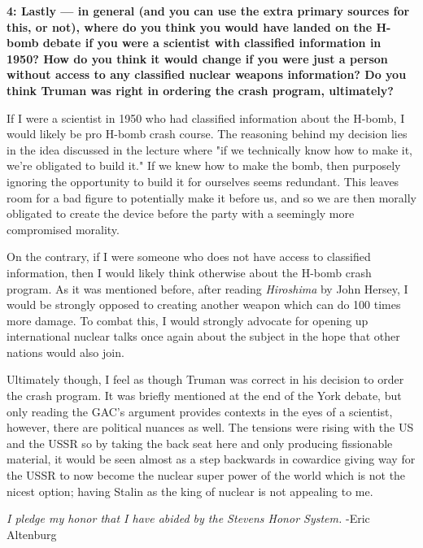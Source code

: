 \documentclass[12pt]{turabian-researchpaper}
\newcommand\question[2]{\noindent\textbf{#1: #2}}
\begin{document}
	\question{4}{Lastly — in general (and you can use the extra primary sources for this, or not), where do you think you would have landed on the H-bomb debate if you were a scientist with classified information in 1950? How do you think it would change if you were just a person without access to any classified nuclear weapons information? Do you think Truman was right in ordering the crash program, ultimately?}

	If I were a scientist in 1950 who had classified information about the H-bomb, I would likely be pro H-bomb crash course. The reasoning behind my decision lies in the idea discussed in the lecture where "if we technically know how to make it, we're obligated to build it." If we knew how to make the bomb, then purposely ignoring the opportunity to build it for ourselves seems redundant. This leaves room for a bad figure to potentially make it before us, and so we are then morally obligated to create the device before the party with a seemingly more compromised morality. 

	On the contrary, if I were someone who does not have access to classified information, then I would likely think otherwise about the H-bomb crash program. As it was mentioned before, after reading \textit{Hiroshima} by John Hersey, I would be strongly opposed to creating another weapon which can do 100 times more damage. To combat this, I would strongly advocate for opening up international nuclear talks once again about the subject in the hope that other nations would also join.

	Ultimately though, I feel as though Truman was correct in his decision to order the crash program. It was briefly mentioned at the end of the York debate, but only reading the GAC's argument provides contexts in the eyes of a scientist, however, there are political nuances as well. The tensions were rising with the US and the USSR so by taking the back seat here and only producing fissionable material, it would be seen almost as a step backwards in cowardice giving way for the USSR to now become the nuclear super power of the world which is not the nicest option; having Stalin as the king of nuclear is not appealing to me.

\vspace*{\fill}
\noindent\textit{I pledge my honor that I have abided by the Stevens Honor System.} -Eric Altenburg
\end{document}

